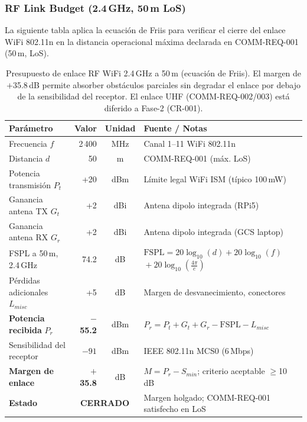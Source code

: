 \subsubsection{RF Link Budget (2.4\,GHz, 50\,m LoS)}

La siguiente tabla aplica la ecuación de Friis \cite{friis_1946} para verificar el cierre del enlace WiFi 802.11n \cite{ieee_802_11n} en la distancia operacional máxima declarada en COMM-REQ-001 (50\,m, LoS). \cite{omg_sysml_mbse, segoldmine_ppi}

\begin{table}[H]
\centering
\scriptsize
\renewcommand{\arraystretch}{1.3}
\begin{tabularx}{\textwidth}{| l | r | c | X |}
\hline
\textbf{Parámetro} & \textbf{Valor} & \textbf{Unidad} & \textbf{Fuente / Notas} \\ \hline

Frecuencia $f$                         & 2\,400  & MHz  & Canal 1--11 WiFi 802.11n \\ \hline
Distancia $d$                          & 50      & m    & COMM-REQ-001 (máx. LoS) \\ \hline
Potencia transmisión $P_t$             & +20     & dBm  & Límite legal WiFi ISM (típico 100\,mW) \\ \hline
Ganancia antena TX $G_t$               & +2      & dBi  & Antena dipolo integrada (RPi5) \\ \hline
Ganancia antena RX $G_r$               & +2      & dBi  & Antena dipolo integrada (GCS laptop) \\ \hline
FSPL a 50\,m, 2.4\,GHz                & 74.2    & dB   & $\text{FSPL}=20\log_{10}(d)+20\log_{10}(f)$\newline${}+20\log_{10}(\tfrac{4\pi}{c})$ \cite{friis_1946} \\ \hline
Pérdidas adicionales $L_{misc}$        & +5      & dB   & Margen de desvanecimiento, conectores \\ \hline
\hline
\textbf{Potencia recibida} $P_r$       & \textbf{$-$55.2}  & dBm  & $P_r = P_t + G_t + G_r - \text{FSPL} - L_{misc}$ \\ \hline
Sensibilidad del receptor              & $-91$   & dBm  & IEEE 802.11n MCS0 (6\,Mbps) \cite{ieee_802_11n} \\ \hline
\textbf{Margen de enlace}              & \textbf{$+$35.8} & dB   & $M = P_r - S_{min}$; criterio aceptable $\ge$10\,dB \\ \hline
\textbf{Estado}                        & \multicolumn{2}{c|}{\textbf{CERRADO}} & Margen holgado; COMM-REQ-001 satisfecho en LoS \\ \hline
\end{tabularx}
\caption{Presupuesto de enlace RF WiFi 2.4\,GHz a 50\,m (ecuación de Friis). El margen de $+$35.8\,dB permite
  absorber obstáculos parciales sin degradar el enlace por debajo de la sensibilidad del receptor. El enlace UHF
  (COMM-REQ-002/003) está diferido a Fase-2 (CR-001).}
\label{tab:rf_link_budget}
\end{table}

